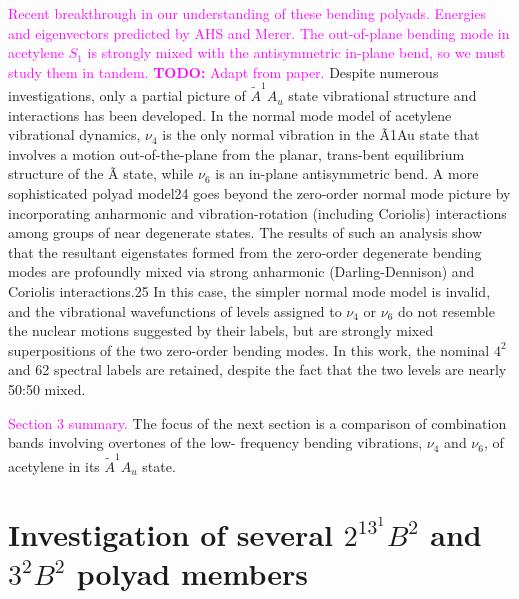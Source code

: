 \documentclass[12pt,draft]{mitthesis}
\newcommand{\TODO} [1]{\textcolor{magenta}{\textbf{TODO:} #1}}
\newcommand{\POINT}[1]{\textcolor{magenta}{#1}}
\begin{document}
\POINT{Recent breakthrough in our understanding of these bending
  polyads.  Energies and eigenvectors predicted by AHS and Merer.  The
  out-of-plane bending mode in acetylene $S_1$ is strongly mixed with
  the antisymmetric in-plane bend, so we must study them in tandem.}
\TODO{Adapt from paper.}  Despite numerous investigations, only a
partial picture of $\tilde{A} ^1A_u$ state vibrational structure and
interactions has been developed.  In the normal mode model of
acetylene vibrational dynamics, $\nu_4$ is the only normal vibration
in the Ã1Au state that involves a motion out-of-the-plane from the
planar, trans-bent equilibrium structure of the Ã state, while $\nu_6$ is
an in-plane antisymmetric bend. A more sophisticated polyad model24
goes beyond the zero-order normal mode picture by incorporating
anharmonic and vibration-rotation (including Coriolis) interactions
among groups of near degenerate states. The results of such an
analysis show that the resultant eigenstates formed from the
zero-order degenerate bending modes are profoundly mixed via strong
anharmonic (Darling-Dennison) and Coriolis interactions.25 In this
case, the simpler normal mode model is invalid, and the vibrational
wavefunctions of levels assigned to $\nu_4$ or $\nu_6$ do not resemble the
nuclear motions suggested by their labels, but are strongly mixed
superpositions of the two zero-order bending modes.  In this work, the
nominal $4^2$ and 62 spectral labels are retained, despite the fact
that the two levels are nearly 50:50 mixed.

\POINT{Section 3 summary.}  The focus of the next section is a
comparison of combination bands involving overtones of the low-
frequency bending vibrations, $\nu_4$ and $\nu_6$, of acetylene in its
$\tilde{A} ^1A_u$ state.

\section{Investigation of several $2^13^1B^2$ and $3^2B^2$ polyad
  members}
\end{document}
